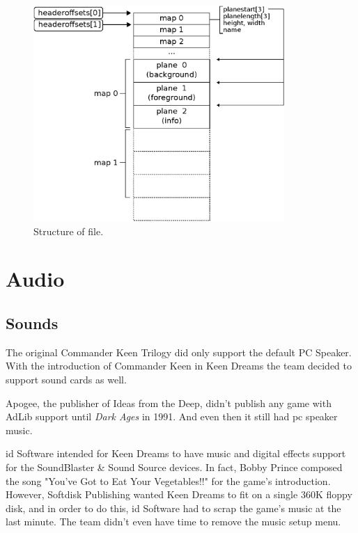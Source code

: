 \documentclass[book.tex]{subfiles}
\begin{document}
\par
\begin{minipage}{\textwidth}
 \par
 \end{minipage}
 
\par
\begin{figure}[H]
\centering
 \includegraphics[width=0.85\textwidth]{imgs/drawings/kdreams_map.eps}
 \caption{Structure of  file.}
 \label{fig:map-file}
\end{figure}

\section{Audio}
\subsection{Sounds}
The original Commander Keen Trilogy did only support the default PC Speaker. With the introduction of Commander Keen in Keen Dreams the team decided to support sound cards as well.\\

\par
{} Apogee, the publisher of Ideas from the Deep, didn't publish any game with AdLib support until \textit{Dark Ages} in 1991. And even then it still had pc speaker music.\\
\par

id Software intended for Keen Dreams to have music and digital effects support for the SoundBlaster \& Sound Source devices. In fact, Bobby Prince composed the song "You've Got to Eat Your Vegetables!!" for the game's introduction. However, Softdisk Publishing wanted Keen Dreams to fit on a single 360K floppy disk, and in order to do this, id Software had to scrap the game's music at the last minute. The team didn't even have time to remove the music setup menu.\\
\end{document}
